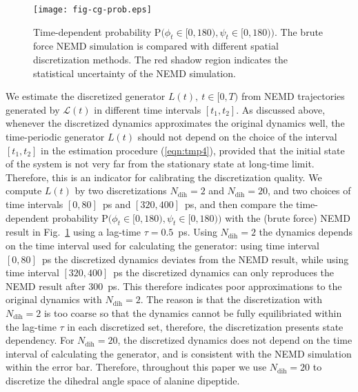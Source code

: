 \documentclass[journal=jctcce,manuscript=article]{achemso}
\newcommand{\recheck}[1]{{\color{red} #1}}
\newcommand{\ml}[0]{\mathcal {L}}
\newcommand{\prob}{\textrm{P}}
\newcommand{\dih}{\textrm{dih}}
\begin{document}
%



\begin{figure}
  \centering
  \texttt{[image: fig-cg-prob.eps]}  
  \caption{Time-dependent probability $\prob\big(\phi_t\in[0,180), \psi_t\in [0,180)\big)$.  The brute force NEMD simulation is compared with different
    spatial discretization methods. The red shadow region indicates the
    statistical uncertainty of the NEMD simulation.}
  \label{fig:tmp2}
\end{figure}

We estimate the discretized generator $L(t), \ t\in[0,T)$
from NEMD trajectories generated by $\ml(t)$ in different time intervals $[t_1,
t_2]$.
As discussed above, whenever  the discretized dynamics approximates the original
dynamics well, the time-periodic generator $L(t)$ should not depend on the choice of the interval $[t_1,t_2]$ in the estimation procedure (\ref{eqn:tmp4}), provided that the initial state of the system
is not very far from the stationary state at long-time limit.
Therefore, this is an indicator for calibrating the discretization quality.
We compute $L(t)$ by two discretizations $N_\dih=2$ and $N_\dih=20$, and two
choices of time intervals $[0, 80]$~ps and $[320, 400]$~ps, and then
compare the time-dependent probability $\prob\big(\phi_t\in[0,180), \psi_t\in [0,180)\big)$
with the (brute force) NEMD result in Fig.~\ref{fig:tmp2} using a lag-time $\tau=0.5$~ps.
Using $N_\dih=2$ the dynamics depends on the time interval used for
calculating the generator: using time interval $[0, 80]$~ps the discretized
dynamics deviates from the NEMD result,
while using time interval $[320, 400]$~ps the discretized dynamics can only
reproduces the NEMD result after 300~ps.  This therefore indicates poor 
approximations to the original dynamics with $N_\dih=2$. The reason is that the
discretization with $N_\dih=2$ is too coarse so that the dynamics cannot be fully
equilibriated within the lag-time $\tau$ in each discretized set,
therefore, the discretization presents state dependency.  For
$N_\dih=20$, the discretized dynamics does not depend on the time interval of
calculating the generator, and is consistent with the
NEMD simulation within the error bar. Therefore, throughout this paper we use $N_\dih=20$
to discretize  the dihedral angle space of alanine dipeptide.
\end{document}
